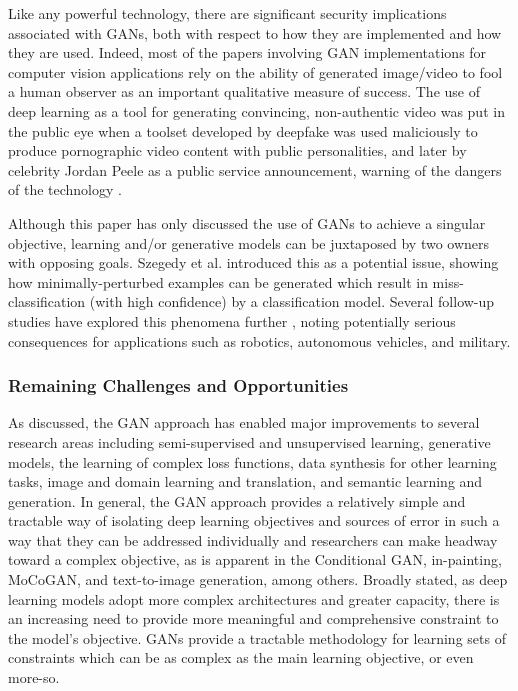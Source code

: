 \documentclass[11pt]{article}
\begin{document}
Like any powerful technology, there are significant security implications associated with GANs, both with respect to how they are implemented and how they are used.  Indeed, most of the papers involving GAN implementations for computer vision applications rely on the ability of generated image/video to fool a human observer as an important qualitative measure of success.  The use of deep learning as a tool for generating convincing, non-authentic video was put in the public eye when a toolset developed by deepfake \cite{deepfakes-faceswap} was used maliciously to produce pornographic video content with public personalities, and later by celebrity Jordan Peele as a public service announcement, warning of the dangers of the technology \cite{peeleDeepFakes}.  

Although this paper has only discussed the use of GANs to achieve a singular objective, learning and/or generative models can be juxtaposed by two owners with opposing goals.  Szegedy et al. introduced this as a potential issue, showing how minimally-perturbed examples can be generated which result in miss-classification (with high confidence) by a classification model.  Several follow-up studies have explored this phenomena further \cite{carlini2016towards, kos2017adversarial, moosavi2017universal, athalye2017synthesizing}, noting potentially serious consequences for applications such as robotics, autonomous vehicles, and military.


\subsubsection{Remaining Challenges and Opportunities}

As discussed, the GAN approach has enabled major improvements to several research areas including semi-supervised and unsupervised learning, generative models, the learning of complex loss functions, data synthesis for other learning tasks, image and domain learning and translation, and semantic learning and generation.  In general, the GAN approach provides a relatively simple and tractable way of isolating deep learning objectives and sources of error in such a way that they can be addressed individually and researchers can make headway toward a complex objective, as is apparent in the Conditional GAN, in-painting, MoCoGAN, and text-to-image generation, among others.  Broadly stated, as deep learning models adopt more complex architectures and greater capacity, there is an increasing need to provide more meaningful and comprehensive constraint to the model's objective.  GANs provide a tractable methodology for learning sets of constraints which can be as complex as the main learning objective, or even more-so.
\end{document}
